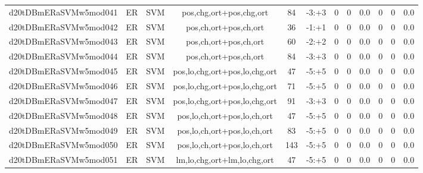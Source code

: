 \documentclass[a4paper]{article}
\begin{document}
\begin{landscape}
\begin{center}
\begin{tabular}{ |c|c|c|c|c|c|c|c|c|c|c|c|}
 
 	
 	\small{ d20tDBmERaSVMw5mod041 } & ER & SVM & pos,chg,ort+pos,chg,ort  &  84 &  -3:+3  &  0 & 0 & 0.0  &  0 & 0 & 0.0 \\
 	

 
 	
 	\small{ d20tDBmERaSVMw5mod042 } & ER & SVM & pos,ch,ort+pos,ch,ort  &  36 &  -1:+1  &  0 & 0 & 0.0  &  0 & 0 & 0.0 \\
 	

 
 	
 	\small{ d20tDBmERaSVMw5mod043 } & ER & SVM & pos,ch,ort+pos,ch,ort  &  60 &  -2:+2  &  0 & 0 & 0.0  &  0 & 0 & 0.0 \\
 	

 
 	
 	\small{ d20tDBmERaSVMw5mod044 } & ER & SVM & pos,ch,ort+pos,ch,ort  &  84 &  -3:+3  &  0 & 0 & 0.0  &  0 & 0 & 0.0 \\
 	

 
 	
 	\small{ d20tDBmERaSVMw5mod045 } & ER & SVM & pos,lo,chg,ort+pos,lo,chg,ort  &  47 &  -5:+5  &  0 & 0 & 0.0  &  0 & 0 & 0.0 \\
 	

 
 	
 	\small{ d20tDBmERaSVMw5mod046 } & ER & SVM & pos,lo,chg,ort+pos,lo,chg,ort  &  71 &  -5:+5  &  0 & 0 & 0.0  &  0 & 0 & 0.0 \\
 	

 
 	
 	\small{ d20tDBmERaSVMw5mod047 } & ER & SVM & pos,lo,chg,ort+pos,lo,chg,ort  &  91 &  -3:+3  &  0 & 0 & 0.0  &  0 & 0 & 0.0 \\
 	

 
 	
 	\small{ d20tDBmERaSVMw5mod048 } & ER & SVM & pos,lo,ch,ort+pos,lo,ch,ort  &  47 &  -5:+5  &  0 & 0 & 0.0  &  0 & 0 & 0.0 \\
 	

 
 	
 	\small{ d20tDBmERaSVMw5mod049 } & ER & SVM & pos,lo,ch,ort+pos,lo,ch,ort  &  83 &  -5:+5  &  0 & 0 & 0.0  &  0 & 0 & 0.0 \\
 	

 
 	
 	\small{ d20tDBmERaSVMw5mod050 } & ER & SVM & pos,lo,ch,ort+pos,lo,ch,ort  &  143 &  -5:+5  &  0 & 0 & 0.0  &  0 & 0 & 0.0 \\
 	

 
 	
 	\small{ d20tDBmERaSVMw5mod051 } & ER & SVM & lm,lo,chg,ort+lm,lo,chg,ort  &  47 &  -5:+5  &  0 & 0 & 0.0  &  0 & 0 & 0.0 \\
 	


\end{tabular}
\end{center}
\end{landscape}
\end{document}
